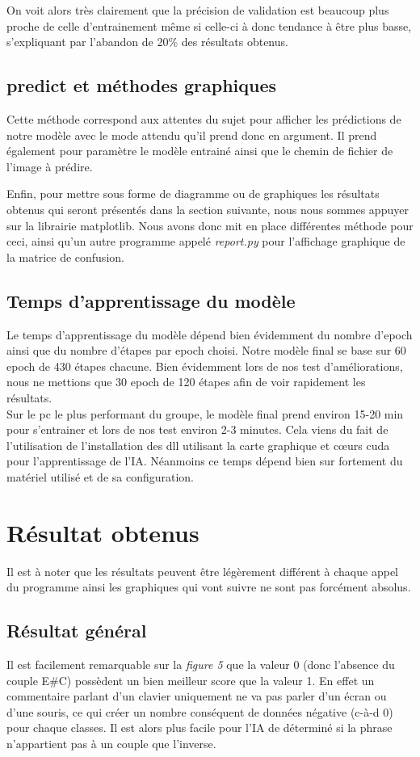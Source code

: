 \documentclass[12pt ,a4paper ]{article}
\begin{document}
\begin{multicols}{2}
On voit alors très clairement que la précision de validation est beaucoup plus proche de celle d'entrainement même si celle-ci à donc tendance à être plus basse, s'expliquant par l'abandon de 20\% des résultats obtenus. 

\subsection{predict et méthodes graphiques}
Cette méthode correspond aux attentes du sujet pour afficher les prédictions de notre modèle avec le mode attendu qu'il prend donc en argument. Il prend également pour paramètre le modèle entrainé ainsi que le chemin de fichier de l'image à prédire. 

Enfin, pour mettre sous forme de diagramme ou de graphiques les résultats obtenus qui seront présentés dans la section suivante, nous nous sommes appuyer sur la librairie matplotlib. Nous avons donc mit en place différentes méthode pour ceci, ainsi qu'un autre programme appelé \textit{report.py} pour l'affichage graphique de la matrice de confusion. 

\subsection{Temps d'apprentissage du modèle}
Le temps d'apprentissage du modèle dépend bien évidemment du nombre d'epoch ainsi que du nombre d'étapes par epoch choisi. Notre modèle final se base sur 60 epoch de 430 étapes chacune. Bien évidemment lors de nos test d'améliorations, nous ne mettions que 30 epoch de 120 étapes afin de voir rapidement les résultats. \\

Sur le pc le plus performant du groupe, le modèle final prend environ 15-20 min pour s'entrainer et lors de nos test environ 2-3 minutes. Cela viens du fait de l'utilisation de l'installation des dll utilisant la carte graphique et cœurs cuda pour l'apprentissage de l'IA. Néanmoins ce temps dépend bien sur fortement du matériel utilisé et de sa configuration.  


\newpage
\section{Résultat obtenus}
Il est à noter que les résultats peuvent être légèrement différent à chaque appel du programme ainsi les graphiques qui vont suivre ne sont pas forcément absolus. 

\subsection{Résultat général}
Il est facilement remarquable sur la \textit{figure 5} que la valeur 0 (donc l'absence du couple E\#C) possèdent un bien meilleur score que la valeur 1. En effet un commentaire parlant d'un clavier uniquement ne va pas parler d'un écran ou d'une souris, ce qui créer un nombre conséquent de données négative (c-à-d 0) pour chaque classes. Il est alors plus facile pour l'IA de déterminé si la phrase n'appartient pas à un couple que l'inverse.\\


\end{multicols}
\end{document}
